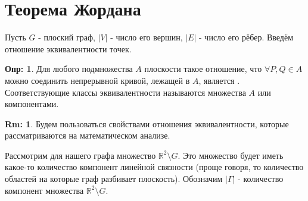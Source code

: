 \documentclass[12pt]{article}
\newcommand{\MR}{\mathbb{R}}
\theoremstyle{definition}
\newtheorem{defn}{Опр:}
\newtheorem{rem}{Rm:}
\begin{document}

\section*{Теорема Жордана}

Пусть $G$ - плоский граф, $|V|$ - число его вершин, $|E|$ -  число его рёбер. Введём отношение эквивалентности точек. 
\begin{defn}
	Для любого подмножества $A$ плоскости такое отношение, что $\forall P,Q \in A$ можно соединить непрерывной кривой, лежащей в $A$, является . Соответствующие классы эквивалентности называются  множества $A$ или компонентами.
\end{defn}
\begin{rem}
	Будем пользоваться свойствами отношения эквивалентности, которые рассматриваются на математическом анализе.
\end{rem}

Рассмотрим для нашего графа множество $\MR^2 \setminus G$. Это множество будет иметь какое-то количество компонент линейной связности (проще говоря, то количество областей на которые граф разбивает плоскость). Обозначим $|\Gamma|$ - количество компонент множества $\MR^2 \setminus G$.
\end{document}
